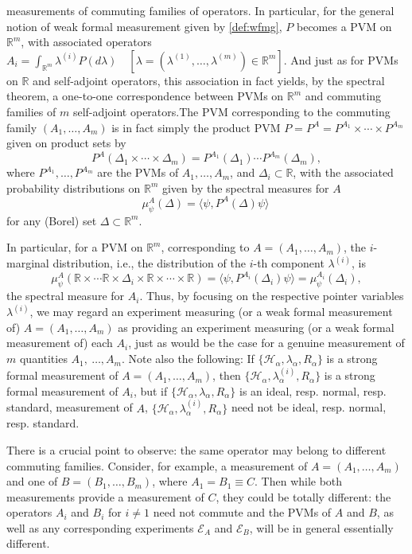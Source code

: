 \documentclass[12pt]{article}
\newcommand{\sa}{self-adjoint}
\newcommand{\avec}[2]{\mbox{${#1}_{1},\ldots,{#1}_{#2}$}}
\renewcommand{\a}{\alpha}
\newcommand{\la}{\lambda_{\a}}
\newcommand{\Ha}{{\H}_{\a}}
\renewcommand{\H}{\mbox{$\mathcal{H}$}}
\newcommand{\Aa}{R_{\a}}
\newcommand{\R}{\mathbb{R}}
\newcommand{\E}{\mbox{$\mathscr{E}$}}
\begin{document}
measurements of commuting families of operators. In particular, for
the general notion of weak formal measurement given by \ref{def:wfmg},
$P$ becomes a PVM on $\R^m$, with associated operators $ A_i=
\int_{\R^m} \lambda^{(i)} P(d\lambda)\quad [\lambda=(
\lambda^{(1)},\ldots,\lambda^{(m)})\in\R^m]$.  And just as for PVMs on
$\R$ and \sa{} operators, this association in fact yields, by the
spectral theorem, a one-to-one correspondence between PVMs on $\R^m$
and commuting families of $m$ \sa{} operators.The PVM corresponding to
the commuting family $(\avec{A}{m})$ is in fact simply the product PVM
$P= P^A= P^{A_1}\times \cdots\times P^{A_m}$ given on product sets by
   \begin{equation}
P^{{A}}(\Delta_1\times\cdots \times\Delta_m)= P^{A_{1}}
(\Delta_{1})\cdots  P^{A_{m}} (\Delta_{m}),
\label{eq:factpvm}
   \end{equation}
%
   where $P^{A_{1}} ,\ldots, P^{A_{m}}$ are the PVMs of $ \avec{A}{m}$,
   and $\Delta_i\subset \R$, with the associated probability
   distributions on $\R^m$ given by the spectral measures for $A$
\begin{equation}
\mu^{{A}}_{\psi}(\Delta)
=\langle\psi, P^{{A}}(\Delta)
\psi\rangle\
\label{plcf}
\end{equation}
%
for any (Borel) set $\Delta\subset\R^m$.

In particular, for a PVM on $\R^m$, corresponding to $A=
(\avec{A}{m})$, the $i$-marginal distribution, i.e., the distribution
of the $i$-th component $ \lambda^{(i)}$, is
$$
\mu^{A}_{\psi }(\R \times \cdots\R \times \Delta_i \times \R \times
\cdots \times \R) =\langle \psi, P^{A_i}( \Delta_i) \psi\rangle=
\mu^{A_i}_{\psi}(\Delta_i),
$$
the spectral measure for $A_i$. Thus, by focusing on the respective
pointer variables $\lambda^{(i)}$, we may regard an experiment
measuring (or a weak formal measurement of) $A= (\avec{A}{m})$ as
providing an experiment measuring (or a weak formal measurement of)
each $A_i$, just as would be the case for a genuine measurement of $m$
quantities $A_1,\ \ldots,A_m$. Note also the following: If $\{\Ha,
\la, \Aa \}$ is a strong formal measurement of $A= (\avec{A}{m})$,
then $\{\Ha, \lambda_\a^{(i)}, \Aa \}$ is a strong formal measurement
of $A_i$, but if $\{\Ha, \la, \Aa \}$ is an ideal, resp. normal, resp.
standard, measurement of $A$, $\{\Ha, \lambda_\a^{(i)}, \Aa \}$ need
not be ideal, resp. normal, resp. standard.


There is a crucial point to observe: the same operator may belong to
different commuting families.  Consider, for example, a measurement of
${A} = (\avec{A}{m})$ and one of ${B} = (\avec{B}{m})$, where
$A_{1}=B_{1}\equiv C$.  Then while both measurements provide a
measurement of $C$, they could be totally different: the operators
$A_{i}$ and $B_{i}$ for $i\neq1 $ need not commute and the PVMs of
${A}$ and ${B}$, as well as any corresponding experiments $\E_A$ and
$\E_B$, will be in general essentially different.
\end{document}
